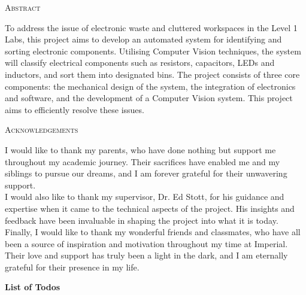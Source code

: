 \documentclass[12pt, a4paper]{article}
\let\oldsection\section
\renewcommand\section[1]{
  \pagebreak\
  \oldsection{#1}
  {\hypersetup{hidelinks}\secttoc\thispagestyle{fancy}}
}
\begin{document}
\newpage
\vspace*{\fill}
\begin{center}
  \large\textsc{Abstract} \\
\end{center}
\noindent To address the issue of electronic waste and cluttered workspaces in the Level 1 Labs, this project aims to develop an automated system for identifying and sorting electronic components. Utilising Computer Vision techniques, the system will classify electrical components such as resistors, capacitors, LEDs and inductors, and sort them into designated bins. The project consists of three core components: the mechanical design of the system, the integration of electronics and software, and the development of a Computer Vision system. This project aims to efficiently resolve these issues. \\
\vspace*{\fill}

\newpage
\vspace*{\fill}
\begin{center}
  \large\textsc{Acknowledgements} \\
\end{center}
\noindent I would like to thank my parents, who have done nothing but support me throughout my academic journey. Their sacrifices have enabled me and my siblings to pursue our dreams, and I am forever grateful for their unwavering support. \\
I would also like to thank my supervisor, Dr. Ed Stott, for his guidance and expertise when it came to the technical aspects of the project. His insights and feedback have been invaluable in shaping the project into what it is today. \\
Finally, I would like to thank my wonderful friends and classmates, who have all been a source of inspiration and motivation throughout my time at Imperial. Their love and support has truly been a light in the dark, and I am eternally grateful for their presence in my life. \\
\vspace*{\fill}
\newpage

{\hypersetup{hidelinks}\tableofcontents\thispagestyle{fancy}}
\newcommand{\neutralizelistoftodos}{
  \begingroup
  \renewcommand{\section}[1]{}
  \newpage
  {\large\textbf{List of Todos}}
  \listoftodos
  \endgroup
}
\neutralizelistoftodos
\end{document}
